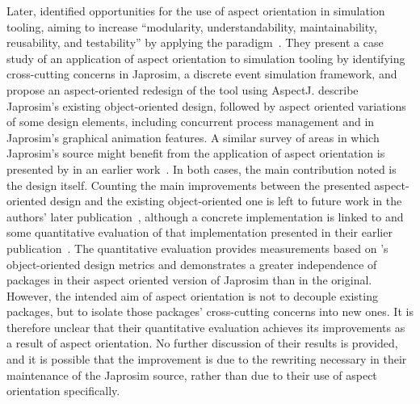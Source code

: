 Later, \citet{chibani2019using} identified opportunities for the use of aspect
orientation in simulation tooling, aiming to increase ``modularity,
understandability, maintainability, reusability, and testability'' by applying
the paradigm~\cite{chibani2019using}. They present a case study of an
application of aspect orientation to simulation tooling by identifying
cross-cutting concerns in Japrosim, a discrete event simulation framework, and
propose an aspect-oriented redesign of the tool using AspectJ.
\citeauthor{chibani2019using} describe Japrosim's existing object-oriented
design, followed by aspect oriented variations of some design elements,
including concurrent process management and in Japrosim's graphical animation
features. A similar survey of areas in which Japrosim's source might benefit
from the application of aspect orientation is presented by
\citeauthor{chibani2014practical} in an earlier
work~\cite{chibani2014practical}. In both cases, the main contribution noted is
the design itself. Counting the main improvements between
the presented aspect-oriented design and the existing object-oriented one is
left to future work
in the authors' later publication~\cite{chibani2019using}, although a concrete
implementation is linked to and some quantitative evaluation of that
implementation presented in their earlier
publication~\cite{chibani2014practical}. The quantitative evaluation provides
measurements based on \citet{martin1994oo}'s object-oriented design metrics
and demonstrates a greater independence of packages in their aspect oriented
version of Japrosim than in the original. However, the intended aim of aspect
orientation is not to decouple existing packages, but to isolate those packages'
cross-cutting concerns into new ones. It is therefore unclear that their
quantitative evaluation achieves its improvements as a result of aspect
orientation. No further discussion of their results is provided, and it is
possible that the improvement is due to the rewriting necessary in their
maintenance of the Japrosim source, rather than due to their use of aspect
orientation specifically.

